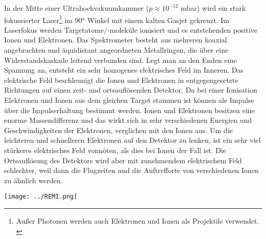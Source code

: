 In der Mitte einer Ultrahochvakuumkammer ($p \approx 10^{-12}$ mbar) wird ein stark fokussierter Laser\footnote{Außer Photonen werden auch Elektronen und Ionen als Projektile verwendet. \cite{ullrich2003}} im 90° Winkel mit einem kalten Gasjet gekreuzt. Im Laserfokus werden Targetatome/-moleküle ionisiert und es entstehenden positive Ionen und Elektronen.
%
Das Spektrometer besteht aus mehreren koaxial angebrachten und äquidistant angeordneten Metallringen, die über eine Widerstandskaskade leitend verbunden sind. Legt man an den Enden eine Spannung an, entsteht ein sehr homogenes elektrisches Feld im Inneren. Das elektrische Feld beschleunigt die Ionen und Elektronen in entgegengesetzte Richtungen auf einen zeit- und ortsauflösenden Detektor. Da bei einer Ionisation Elektronen und Ionen aus dem gleichen Target stammen ist können ale Impulse über die Impulserhaltung bestimmt werden. Ionen und Elektronen besitzen eine enorme Massendifferenz und das wirkt sich in sehr verschiedenen Energien und Geschwindigkeiten der Elektronen, verglichen mit den Ionen aus. Um die leichteren und schnelleren Elektronen auf den Detektor zu lenken, ist  ein sehr viel stärkeres elektrisches Feld vonnöten, als dies bei Ionen der Fall ist. Die Ortsauflösung des Detektors wird aber mit zunehmendem elektrischem Feld schlechter, weil dann die Flugzeiten und die Auftrefforte von verschiedenen Ionen zu ähnlich werden.
%
\begin{center}
\begin{minipage}{\linewidth}
\centering
\texttt{[image: ../REMI.png]}%
 \label{fig:REMI} 
\end{minipage} 
\end{center} 
%
%


